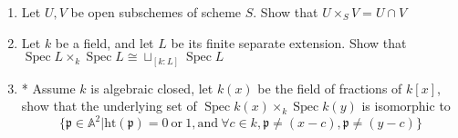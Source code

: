 \documentclass[a4paper,11pt]{article}
\def\bb#1{\mathbb{#1}}
\def\mrm#1{\mathrm{#1}}
\DeclareMathOperator{\Spec}{Spec}
\begin{document}
\begin{enumerate}[1.]
\begin{enumerate}
    \item Let $U,V$ be open subschemes of scheme $S$. Show that $U\times_S V=U\cap V$
    \item Let $k$ be a field, and let $L$ be its finite separate extension. Show that $\Spec L \times_k \Spec L \cong \sqcup_{[k:L]}\Spec L$
    \item* Assume $k$ is algebraic closed, let $k(x)$ be the field of fractions of $k[x]$, show that the underlying set of
    $\Spec k(x) \times_k \Spec k(y)$ is isomorphic to
    \[ \{\mathfrak{p}\in\bb{A}^2| \mathrm{ht}(\mathfrak{p})=0\ \mathrm{or}\ 1,\mrm{and\ }\forall c\in k, \mathfrak{p}\neq (x-c),\mathfrak{p}\neq(y-c)\}\]
\end{enumerate}

\begin{comment}
\item Let $A\to B$ be a integral extension, and let $\mathfrak{p}$ be a prime ideal of $B$
\begin{enumerate}
    \item Show that for any prime ideal $\mathfrak{q}$ of $B$ such that $\mathfrak{p}\cap A\subset\mathfrak{q}\subset \mathfrak{p}$, then $\mathfrak{q}= \mathfrak{p}$
    \item* Use induction to show that $\mathrm{ht}(\mathfrak{p}\subset B)=\mathrm{ht}(\mathfrak{p}\cap A\subset A)$
\end{enumerate}
\end{comment}

\end{enumerate}
\end{document}
